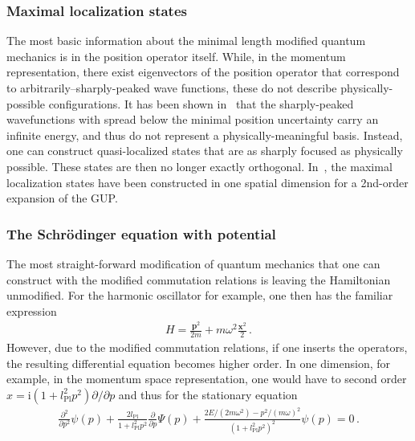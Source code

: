 \documentclass{article}
\def\beqn{\begin{eqnarray}}
\def\eeqn{\end{eqnarray}}
\begin{document}
\subsubsection{Maximal localization states}

The most basic information about the minimal length modified quantum mechanics is in the position operator
itself. While, in the momentum representation, there exist eigenvectors of the position operator
that correspond to arbitrarily--sharply-peaked wave functions, 
these do not describe physically-possible configurations. It has been shown in~\cite{Kempf:1994su} that
the sharply-peaked wavefunctions with spread below the minimal position uncertainty carry an infinite energy,
and thus do not represent a physically-meaningful basis.
Instead, one can construct quasi-localized states that are as sharply focused as physically possible. These
states are then no longer exactly orthogonal. In~\cite{Kempf:1994su}, the maximal localization states have
been constructed in one spatial dimension for a 2nd-order expansion of the {\sc GUP}.  

\subsubsection{The Schr{\"o}dinger equation with potential}
\label{schroedinger}

The most straight-forward modification of quantum mechanics that one can construct with the modified commutation
relations is leaving the Hamiltonian unmodified. For the harmonic oscillator for example, 
one then has the familiar expression
\beqn
H = \frac{\mathbf{p}^2}{2m} + m \omega^2 \frac{\mathbf{x}^2}{2} \,.
\eeqn
However, due to the modified commutation relations, if one inserts the operators, the resulting differential
equation becomes higher order. In one dimension, for example, in the momentum space representation, one would have
to second order
$\hat x = \mathrm{i} (1 + l^2_{\mathrm{Pl}} p^2) \partial/\partial p$  and thus for the stationary equation
\beqn
\frac{\partial^2}{\partial p^2} \psi(p) + \frac{2 l_{\mathrm{Pl}}}{1+ l_{\mathrm{Pl}}^2 p^2} \frac{\partial}{\partial p} \Psi(p) + 
\frac{2E/(2m \omega^2) - p^2/(m\omega)^2}{(1+l_{\mathrm{Pl}}^2 p^2 )^2} \psi(p) = 0 \,.
\eeqn
\end{document}
